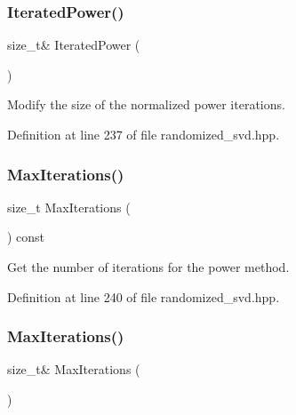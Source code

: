 \subsubsection{Iterated\+Power()\hspace{0.1cm}{\footnotesize\ttfamily [2/2]}}
{\footnotesize\ttfamily size\+\_\+t\& Iterated\+Power (\begin{DoxyParamCaption}{ }\end{DoxyParamCaption})\hspace{0.3cm}{\ttfamily [inline]}}



Modify the size of the normalized power iterations. 



Definition at line 237 of file randomized\+\_\+svd.\+hpp.

\mbox{\label{classmlpack_1_1svd_1_1RandomizedSVD_a420770944a5b0c7a852c4ec372c4a2d1}} 
\subsubsection{Max\+Iterations()\hspace{0.1cm}{\footnotesize\ttfamily [1/2]}}
{\footnotesize\ttfamily size\+\_\+t Max\+Iterations (\begin{DoxyParamCaption}{ }\end{DoxyParamCaption}) const\hspace{0.3cm}{\ttfamily [inline]}}



Get the number of iterations for the power method. 



Definition at line 240 of file randomized\+\_\+svd.\+hpp.

\mbox{\label{classmlpack_1_1svd_1_1RandomizedSVD_acda675ab4ab86b95c92bc33bc391a61b}} 
\subsubsection{Max\+Iterations()\hspace{0.1cm}{\footnotesize\ttfamily [2/2]}}
{\footnotesize\ttfamily size\+\_\+t\& Max\+Iterations (\begin{DoxyParamCaption}{ }\end{DoxyParamCaption})\hspace{0.3cm}{\ttfamily [inline]}}



